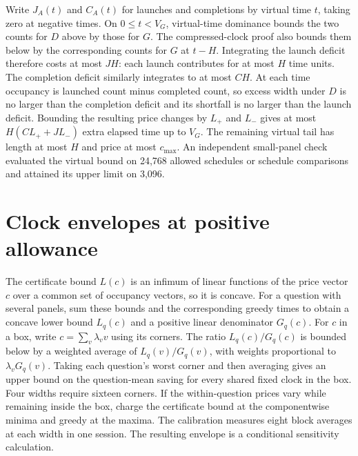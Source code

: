 Write \(J_A(t)\) and \(C_A(t)\) for launches and completions by virtual time \(t\), taking zero at negative times. On \(0\le t<V_G\), virtual-time dominance bounds the two counts for \(D\) above by those for \(G\). The compressed-clock proof also bounds them below by the corresponding counts for \(G\) at \(t-H\). Integrating the launch deficit therefore costs at most \(JH\): each launch contributes for at most \(H\) time units. The completion deficit similarly integrates to at most \(CH\). At each time occupancy is launched count minus completed count, so excess width under \(D\) is no larger than the completion deficit and its shortfall is no larger than the launch deficit. Bounding the resulting price changes by \(L_+\) and \(L_-\) gives at most \(H(CL_++JL_-)\) extra elapsed time up to \(V_G\). The remaining virtual tail has length at most \(H\) and price at most \(c_{\max}\). An independent small-panel check evaluated the virtual bound on 24,768 allowed schedules or schedule comparisons and attained its upper limit on 3,096.

\section{Clock envelopes at positive allowance}\label{app:box}
The certificate bound $L(c)$ is an infimum of linear functions of the price vector $c$ over a common set of occupancy vectors, so it is concave. For a question with several panels, sum these bounds and the corresponding greedy times to obtain a concave lower bound $L_q(c)$ and a positive linear denominator $G_q(c)$. For $c$ in a box, write $c=\sum_v\lambda_v v$ using its corners. The ratio $L_q(c)/G_q(c)$ is bounded below by a weighted average of $L_q(v)/G_q(v)$, with weights proportional to $\lambda_vG_q(v)$. Taking each question's worst corner and then averaging gives an upper bound on the question-mean saving for every shared fixed clock in the box. Four widths require sixteen corners. If the within-question prices vary while remaining inside the box, charge the certificate bound at the componentwise minima and greedy at the maxima. The calibration measures eight block averages at each width in one session. The resulting envelope is a conditional sensitivity calculation.

